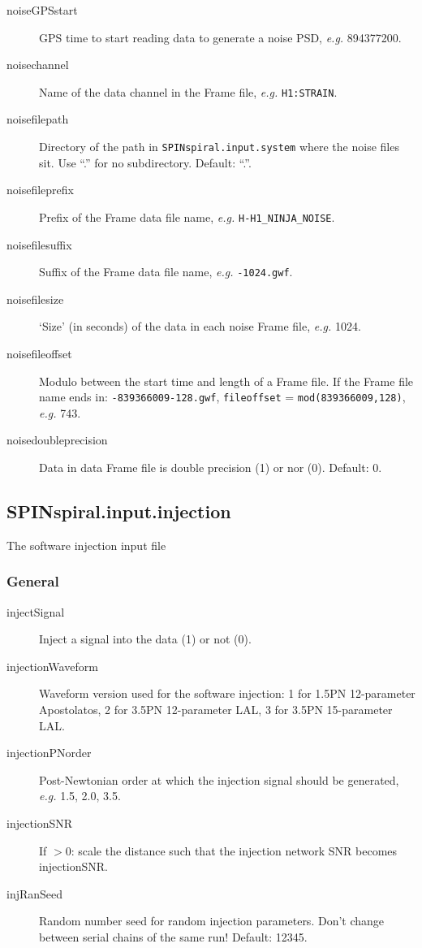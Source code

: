 \begin{description}
\item[noiseGPSstart] GPS time to start reading data to generate a noise PSD,  \textit{e.g.} 894377200.
\item[noisechannel] Name of the data channel in the Frame file, \textit{e.g.} \texttt{H1:STRAIN}.
\item[noisefilepath] Directory of the path in \texttt{SPINspiral.input.system} where the noise files sit.  Use ``.'' for no subdirectory.  Default: ``.''.
\item[noisefileprefix] Prefix of the Frame data file name, \textit{e.g.} \texttt{H-H1\_NINJA\_NOISE}.
\item[noisefilesuffix] Suffix of the Frame data file name, \textit{e.g.} \texttt{-1024.gwf}.
\item[noisefilesize] `Size' (in seconds) of the data in each noise Frame file,  \textit{e.g.} 1024.
\item[noisefileoffset]  Modulo between the start time and length of a Frame file.  If the Frame file name ends in: \texttt{-839366009-128.gwf}, \texttt{fileoffset} = \texttt{mod(839366009,128)},  \textit{e.g.} 743.
\item[noisedoubleprecision] Data in data Frame file is double precision (1) or nor (0).  Default: 0.
\end{description}






\pagebreak
\subsection{SPINspiral.input.injection}
The software injection input file


\subsubsection{General}
\begin{description}
\item[injectSignal] Inject a signal into the data (1) or not (0).
\item[injectionWaveform] Waveform version used for the software injection:  1 for 1.5PN 12-parameter Apostolatos, 2 for 3.5PN 12-parameter LAL, 3 for 3.5PN 15-parameter LAL.
\item[injectionPNorder] Post-Newtonian order at which the injection signal should be generated, \textit{e.g.} 1.5, 2.0, 3.5.
\item[injectionSNR] If $>0$: scale the distance such that the injection network SNR becomes injectionSNR.
\item[injRanSeed] Random number seed for random injection parameters. Don't change between serial chains of the same run!  Default: 12345.
\end{description}


